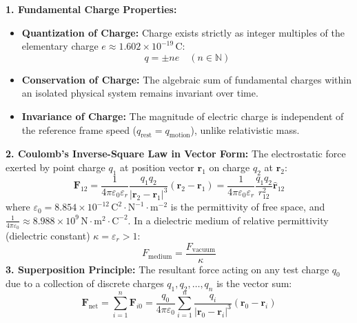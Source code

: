 \documentclass[10pt,a4paper]{article}
\begin{document}
\begin{conceptbox}
\textbf{1. Fundamental Charge Properties:}
\begin{itemize}
  \item \textbf{Quantization of Charge:} Charge exists strictly as integer multiples of the elementary charge $e \approx 1.602 \times 10^{-19}\,\mathrm{C}$:
  \begin{equation}
    q = \pm n e \quad (n \in \mathbb{N})
  \end{equation}
  \item \textbf{Conservation of Charge:} The algebraic sum of fundamental charges within an isolated physical system remains invariant over time.
  \item \textbf{Invariance of Charge:} The magnitude of electric charge is independent of the reference frame speed ($q_{\text{rest}} = q_{\text{motion}}$), unlike relativistic mass.
\end{itemize}
\textbf{2. Coulomb's Inverse-Square Law in Vector Form:}
The electrostatic force exerted by point charge $q_1$ at position vector $\mathbf{r}_1$ on charge $q_2$ at $\mathbf{r}_2$:
\begin{equation}
  \mathbf{F}_{12} = \frac{1}{4\pi\varepsilon_0 \varepsilon_r} \frac{q_1 q_2}{|\mathbf{r}_2 - \mathbf{r}_1|^3} (\mathbf{r}_2 - \mathbf{r}_1) = \frac{1}{4\pi\varepsilon_0 \varepsilon_r} \frac{q_1 q_2}{r_{12}^2} \hat{\mathbf{r}}_{12}
\end{equation}
where $\varepsilon_0 = 8.854 \times 10^{-12}\,\mathrm{C}^2\cdot\mathrm{N}^{-1}\cdot\mathrm{m}^{-2}$ is the permittivity of free space, and $\frac{1}{4\pi\varepsilon_0} \approx 8.988 \times 10^9\,\mathrm{N}\cdot\mathrm{m}^2\cdot\mathrm{C}^{-2}$.
In a dielectric medium of relative permittivity (dielectric constant) $\kappa = \varepsilon_r > 1$:
\begin{equation}
  F_{\text{medium}} = \frac{F_{\text{vacuum}}}{\kappa}
\end{equation}
\textbf{3. Superposition Principle:}
The resultant force acting on any test charge $q_0$ due to a collection of discrete charges $q_1, q_2, \dots, q_n$ is the vector sum:
\begin{equation}
  \mathbf{F}_{\text{net}} = \sum_{i=1}^n \mathbf{F}_{i0} = \frac{q_0}{4\pi\varepsilon_0} \sum_{i=1}^n \frac{q_i}{|\mathbf{r}_0 - \mathbf{r}_i|^3} (\mathbf{r}_0 - \mathbf{r}_i)
\end{equation}
\end{conceptbox}
\end{document}
